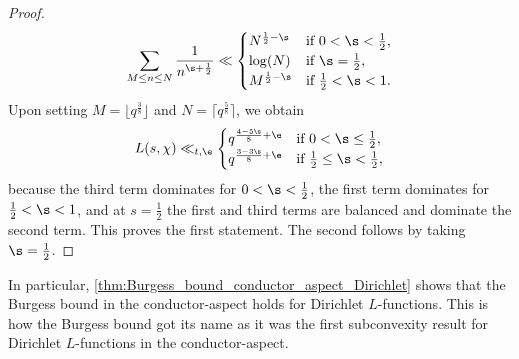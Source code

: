 \begin{proof}
      \[
        \sum_{M \le n \le N}\frac{1}{n^{\s+\frac{1}{2}}} \ll \begin{cases} N^{\frac{1}{2}-\s} & \text{if $0 < \s < \frac{1}{2}$}, \\ \log(N) & \text{if $\s = \frac{1}{2}$}, \\ M^{\frac{1}{2}-\s} & \text{if $\frac{1}{2} < \s < 1$}. \end{cases}
      \]
       Upon setting $M = \lfloor q^{\frac{3}{8}} \rfloor$ and $N = \lceil q^{\frac{5}{8}} \rceil$, we obtain
      \[
        L(s,\chi) \ll_{t,\e} \begin{cases} q^{\frac{4-5\s}{8}+\e} & \text{if $0 < \s \le \frac{1}{2}$}, \\ q^{\frac{3-3\s}{8}+\e} & \text{if $\frac{1}{2} \le \s < \frac{1}{2}$}, \end{cases}
      \]
      because the third term dominates for $0 < \s < \frac{1}{2}$, the first term dominates for $\frac{1}{2} < \s < 1$, and at $s = \frac{1}{2}$ the first and third terms are balanced and dominate the second term. This proves the first statement. The second follows by taking $\s = \frac{1}{2}$.
    \end{proof}

    In particular, \cref{thm:Burgess_bound_conductor_aspect_Dirichlet} shows that the Burgess bound in the conductor-aspect holds for Dirichlet $L$-functions. This is how the Burgess bound got its name as it was the first subconvexity result for Dirichlet $L$-functions in the conductor-aspect.